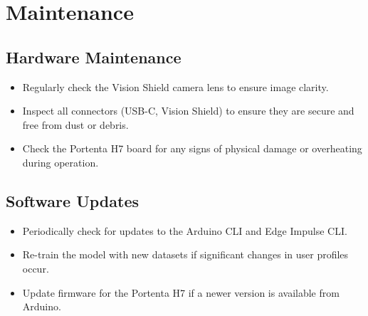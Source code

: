 %
%

\chapter{Maintenance}

\section{Hardware Maintenance}
\begin{itemize}
	\item Regularly check the Vision Shield camera lens to ensure image clarity.
	\item Inspect all connectors (USB-C, Vision Shield) to ensure they are secure and free from dust or debris.
	\item Check the Portenta H7 board for any signs of physical damage or overheating during operation.
\end{itemize}

\section{Software Updates}
\begin{itemize}
	\item Periodically check for updates to the Arduino CLI and Edge Impulse CLI.
	\item Re-train the model with new datasets if significant changes in user profiles occur.
	\item Update firmware for the Portenta H7 if a newer version is available from Arduino.
\end{itemize}




